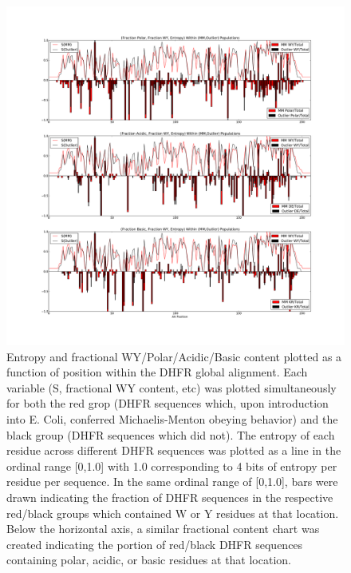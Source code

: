 \documentclass[a4paper,11pt]{article}
\begin{document}
\begin{figure}[h]
\centerline{\includegraphics[width=8in]{AA+S.pdf}}
\caption[$S_{\rm red}$, $S_{\rm black}$, WY/Polar/Acidic/Basic Content vs Residue \#]{Entropy and fractional WY/Polar/Acidic/Basic content plotted as a function of position within the DHFR global alignment. Each variable (S, fractional WY content, etc) was plotted simultaneously for both the red grop (DHFR sequences which, upon introduction into E. Coli, conferred Michaelis-Menton obeying behavior) and the black group (DHFR sequences which did not). The entropy of each residue across different DHFR sequences was plotted as a line in the ordinal range [0,1.0] with 1.0 corresponding to 4 bits of entropy per residue per sequence. In the same ordinal range of [0,1.0], bars were drawn indicating the fraction of DHFR sequences in the respective red/black groups which contained W or Y residues at that location. Below the horizontal axis, a similar fractional content chart was created indicating the portion of red/black DHFR sequences containing polar, acidic, or basic residues at that location.}
\end{figure}
\end{document}
